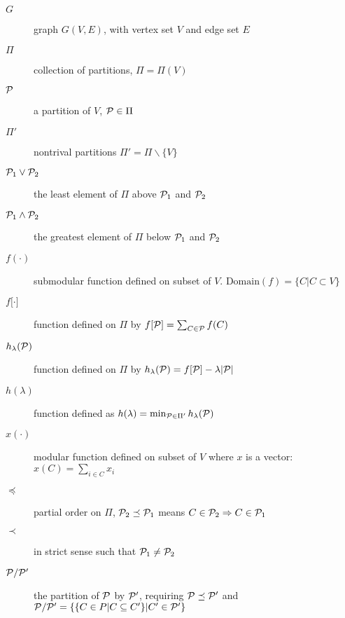 \begin{description}
\item[$G$] graph $G(V,E)$, with vertex set $V$ and edge set $E$
\item[$\Pi$] collection of partitions, $\Pi = \Pi(V)$
\item[$\P$] a partition of $V$, $\P \in \Pi$
\item[$\Pi'$] nontrival partitions $\Pi' = \Pi \backslash \{V\}$
\item[$\P_1 \vee \P_2$] the least element of $\Pi$ above $\P_1$ and $\P_2$
\item[$\P_1 \wedge \P_2$] the greatest element of $\Pi$ below $\P_1$ and $\P_2$
\item[$f(\cdot)$] submodular function defined on subset of $V$. $\mathrm{Domain}(f)=\{C| C\subset V\}$
\item[$f{[}\cdot{]}$] function defined on $\Pi$ by $f[\P] = \sum_{C\in \P} f(C)$
\item[$h_{\lambda}(\P)$] function defined on $\Pi$ by $h_{\lambda}(\P)=f[\P]-\lambda\abs{\P}$
\item[$h(\lambda)$] function defined as $ h(\lambda) = \min_{\P \in \Pi'} h_{\lambda}(\P)$
\item[$x(\cdot)$] modular function defined on subset of $V$ where $x$ is a vector: $x(C)=\sum_{i \in C} x_i$
\item[$\preceq$] partial order on $\Pi$, $\P_2 \preceq \P_1$ means $C\in \P_2 \Rightarrow C \in \P_1$
\item[$\prec$] in strict sense such that $\P_1 \neq \P_2 $
\item[$\P/\P'$] the partition of $\P$ by $\P'$, requiring $\P\preceq \P'$ and $\P/\P'=\{\{ C \in P | C \subseteq C' \} | C' \in \P'\}$
\end{description}

